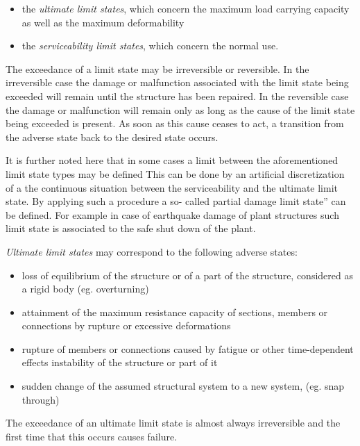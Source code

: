 \documentclass[%
oneside,                 %
final,                   %
10pt]{article}
\begin{document}
\begin{itemize}
\item the \emph{ultimate limit states}, which concern the maximum load carrying capacity as well as the maximum deformability

\item the \emph{serviceability limit states}, which concern the normal use.
\end{itemize}

\noindent
The exceedance of a limit state may be irreversible or reversible. In the irreversible case the damage or malfunction associated with the limit state being exceeded will remain until the structure has been repaired. In the reversible case the damage or malfunction will remain only as long as the cause of the limit state being exceeded is present. As soon as this cause ceases to act, a transition from the adverse state back to the desired state occurs.

It is further noted here that in some cases a limit between the aforementioned limit state types may be defined This can be done by an artificial discretization of a the continuous situation between the serviceability and the ultimate limit state. By applying such a procedure a so- called partial damage limit state” can be defined. For example in case of earthquake damage of plant structures such limit state is associated to the safe shut down of the plant.

\emph{Ultimate limit states} may correspond to the following adverse states:
\begin{itemize}
\item loss of equilibrium of the structure or of a part of the structure, considered as a rigid body (eg. overturning)

\item attainment of the maximum resistance capacity of sections, members or connections by rupture or excessive deformations

\item rupture of members or connections caused by fatigue or other time-dependent effects instability of the structure or part of it

\item sudden change of the assumed structural system to a new system, (eg. snap through)
\end{itemize}

\noindent
The exceedance of an ultimate limit state is almost always irreversible and the first time that this occurs causes failure.
\end{document}
